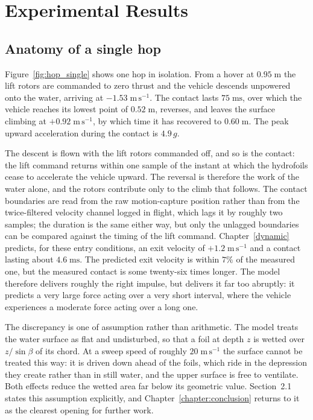 \section{Experimental Results}
\label{sec:exp_results}


\subsection{Anatomy of a single hop}
\label{sec:single_hop}

Figure~\ref{fig:hop_single} shows one hop in isolation.  From a hover at
$0.95\;\mathrm{m}$ the lift rotors are commanded to zero thrust and the
vehicle descends unpowered onto the water, arriving at
$-1.53\;\mathrm{m\,s^{-1}}$.  The contact lasts $75\;\mathrm{ms}$, over
which the vehicle reaches its lowest point of $0.52\;\mathrm{m}$, reverses,
and leaves the surface climbing at $+0.92\;\mathrm{m\,s^{-1}}$, by which
time it has recovered to $0.60\;\mathrm{m}$.  The peak upward acceleration
during the contact is $4.9\,g$.

The descent is flown with the lift rotors commanded off, and so is the
contact: the lift command returns within one sample of the instant at which
the hydrofoils cease to accelerate the vehicle upward.  The reversal is
therefore the work of the water alone, and the rotors contribute only to the
climb that follows.  The contact boundaries are read from the raw
motion-capture position rather than from the twice-filtered velocity channel
logged in flight, which lags it by roughly two samples; the duration is the
same either way, but only the unlagged boundaries can be compared against the
timing of the lift command.
Chapter~\ref{dynamic} predicts, for these entry conditions, an exit velocity
of $+1.2\;\mathrm{m\,s^{-1}}$ and a contact lasting about
$4.6\;\mathrm{ms}$.  The predicted exit velocity is within $7\%$ of the
measured one, but the measured contact is some twenty-six times longer.  The model therefore delivers roughly the right
impulse, but delivers it far too abruptly: it predicts a very large force
acting over a very short interval, where the vehicle experiences a moderate
force acting over a long one.

The discrepancy is one of assumption rather than arithmetic.  The model treats
the water surface as flat and undisturbed, so that a foil at depth $z$ is
wetted over $z/\sin\beta$ of its chord.  At a sweep speed of roughly
$20\;\mathrm{m\,s^{-1}}$ the surface cannot be treated this way: it is driven
down ahead of the foils, which ride in the depression they create rather than
in still water, and the upper surface is free to ventilate.  Both effects
reduce the wetted area far below its geometric value.  Section~2.1 states this
assumption explicitly, and Chapter~\ref{chapter:conclusion} returns to it as
the clearest opening for further work.

